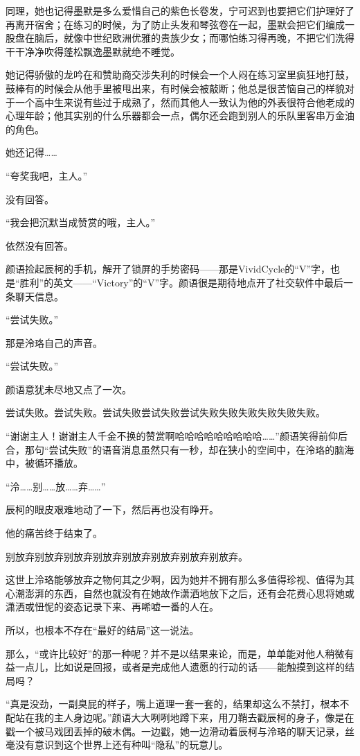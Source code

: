 \documentclass[UTF8, scheme = chinese, openany]{ctexbook}
\begin{document}
同理，她也记得墨默是多么爱惜自己的紫色长卷发，宁可迟到也要把它们护理好了再离开宿舍；在练习的时候，为了防止头发和琴弦卷在一起，墨默会把它们编成一股盘在脑后，就像中世纪欧洲优雅的贵族少女；而哪怕练习得再晚，不把它们洗得干干净净吹得蓬松飘逸墨默就绝不睡觉。

她记得骄傲的龙吟在和赞助商交涉失利的时候会一个人闷在练习室里疯狂地打鼓，鼓棒有的时候会从他手里被甩出来，有时候会被敲断；他总是很苦恼自己的样貌对于一个高中生来说有些过于成熟了，然而其他人一致认为他的外表很符合他老成的心理年龄；他其实别的什么乐器都会一点，偶尔还会跑到别人的乐队里客串万金油的角色。

她还记得……

“夸奖我吧，主人。”

没有回答。

“我会把沉默当成赞赏的哦，主人。”

依然没有回答。

颜语捡起辰柯的手机，解开了锁屏的手势密码——那是VividCycle的“V”字，也是“胜利”的英文——“Victory”的“V”字。颜语很是期待地点开了社交软件中最后一条聊天信息。

“尝试失败。”

那是泠珞自己的声音。

“尝试失败。”

颜语意犹未尽地又点了一次。

尝试失败。尝试失败。尝试失败尝试失败尝试失败失败失败失败失败失败。

“谢谢主人！谢谢主人千金不换的赞赏啊哈哈哈哈哈哈哈哈哈……”颜语笑得前仰后合，那句“尝试失败”的语音消息虽然只有一秒，却在狭小的空间中，在泠珞的脑海中，被循环播放。

“泠……别……放……弃……”

辰柯的眼皮艰难地动了一下，然后再也没有睁开。

他的痛苦终于结束了。

别放弃别放弃别放弃别放弃别放弃别放弃别放弃别放弃。

这世上泠珞能够放弃之物何其之少啊，因为她并不拥有那么多值得珍视、值得为其心潮澎湃的东西，自然也就没有在她故作潇洒地放下之后，还有会花费心思将她或潇洒或忸怩的姿态记录下来、再唏嘘一番的人在。

所以，也根本不存在“最好的结局”这一说法。

那么，“或许比较好”的那一种呢？并不是以结果来论，而是，单单能对他人稍微有益一点儿，比如说是回报，或者是完成他人遗愿的行动的话——能触摸到这样的结局吗？

“真是没劲，一副臭屁的样子，嘴上道理一套一套的，结果却这么不禁打，根本不配站在我的主人身边呢。”颜语大大咧咧地蹲下来，用刀鞘去戳辰柯的身子，像是在戳一个被马戏团丢掉的破木偶。一边戳，她一边滑动着辰柯与泠珞的聊天记录，丝毫没有意识到这个世界上还有种叫“隐私”的玩意儿。
\end{document}

